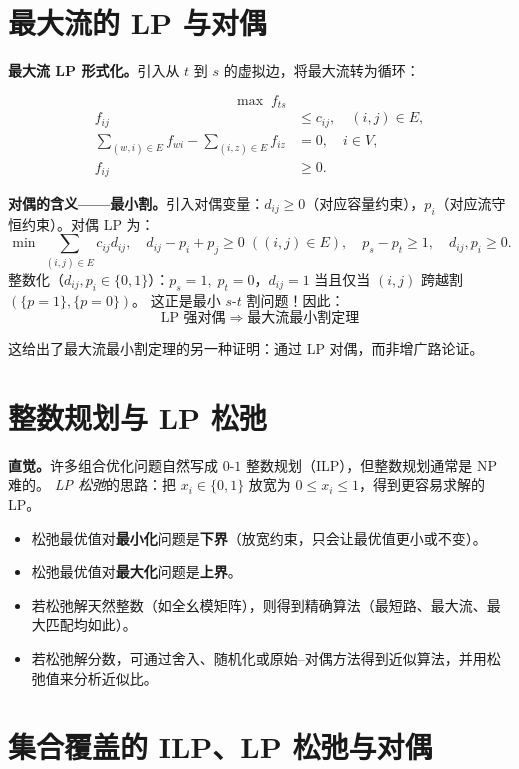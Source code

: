 \documentclass[UTF8,openany,12pt]{ctexbook}
\theoremstyle{remark}
\begin{document}
\section{最大流的 LP 与对偶}

\noindent\textbf{最大流 LP 形式化。}引入从 $t$ 到 $s$ 的虚拟边，将最大流转为循环：

\[
  \max\; f_{ts}
\]
\begin{align*}
  f_{ij} &\le c_{ij},\quad (i,j)\in E, \\
  \sum_{(w,i)\in E}f_{wi} - \sum_{(i,z)\in E}f_{iz} &= 0,\quad i\in V, \\
  f_{ij} &\ge 0.
\end{align*}

\noindent\textbf{对偶的含义——最小割。}引入对偶变量：$d_{ij}\ge0$（对应容量约束），$p_i$（对应流守恒约束）。对偶 LP 为：
\[
  \min\;\sum_{(i,j)\in E}c_{ij}d_{ij},\quad d_{ij}-p_i+p_j\ge0\;((i,j)\in E),\quad p_s-p_t\ge1,\quad d_{ij},p_i\ge0.
\]
整数化（$d_{ij},p_i\in\{0,1\}$）：$p_s=1,\;p_t=0$，$d_{ij}=1$ 当且仅当 $(i,j)$ 跨越割 $(\{p=1\},\{p=0\})$。
这正是最小 $s$-$t$ 割问题！因此：
\[
  \text{LP 强对偶}\;\Rightarrow\;\text{最大流最小割定理}
\]

这给出了最大流最小割定理的另一种证明：通过 LP 对偶，而非增广路论证。

\section{整数规划与 LP 松弛}

\noindent\textbf{直觉。}许多组合优化问题自然写成 $0$-$1$ 整数规划（ILP），但整数规划通常是 NP 难的。
\emph{LP 松弛}的思路：把 $x_i\in\{0,1\}$ 放宽为 $0\le x_i\le 1$，得到更容易求解的 LP。

\begin{itemize}
  \item 松弛最优值对\textbf{最小化}问题是\textbf{下界}（放宽约束，只会让最优值更小或不变）。
  \item 松弛最优值对\textbf{最大化}问题是\textbf{上界}。
  \item 若松弛解天然整数（如全幺模矩阵），则得到精确算法（最短路、最大流、最大匹配均如此）。
  \item 若松弛解分数，可通过舍入、随机化或原始--对偶方法得到近似算法，并用松弛值来分析近似比。
\end{itemize}

\section{集合覆盖的 ILP、LP 松弛与对偶}
\end{document}
